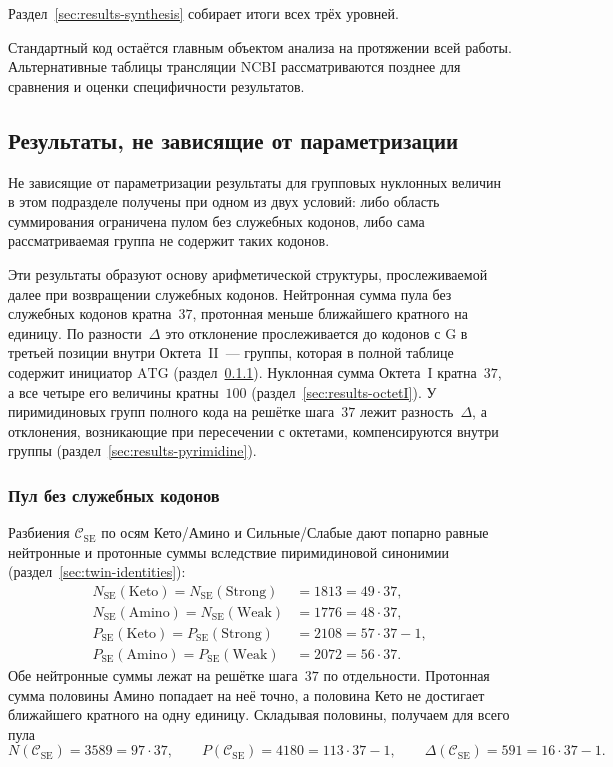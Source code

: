 \documentclass[11pt,a4paper]{article}
\renewcommand{\_}{\origunderscore\allowbreak}
\begin{document}
Раздел~\ref{sec:results-synthesis} собирает итоги всех трёх уровней.

Стандартный код остаётся главным объектом анализа на протяжении всей
работы. Альтернативные таблицы трансляции NCBI рассматриваются позднее
для сравнения и оценки специфичности результатов.

\subsection{Результаты, не зависящие от параметризации}
\label{sec:results-independent}

Не зависящие от параметризации результаты для групповых нуклонных
величин в этом подразделе получены при одном из двух условий: либо
область суммирования ограничена пулом без служебных кодонов, либо сама
рассматриваемая группа не содержит таких кодонов.

Эти результаты образуют основу арифметической структуры,
прослеживаемой далее при возвращении служебных кодонов. Нейтронная сумма пула без служебных кодонов кратна~$37$, протонная
меньше ближайшего кратного на единицу. По разности~$\Delta$ это
отклонение прослеживается до кодонов с $\mathrm{G}$ в третьей позиции
внутри Октета~II~--- группы, которая в полной таблице содержит
инициатор $\mathrm{ATG}$ (раздел~\ref{sec:results-sensepool}).
Нуклонная сумма Октета~I кратна~$37$, а все четыре его величины
кратны~$100$
(раздел~\ref{sec:results-octetI}). У пиримидиновых групп полного кода
на решётке шага~$37$ лежит разность~$\Delta$, а отклонения, возникающие
при пересечении с октетами, компенсируются внутри группы
(раздел~\ref{sec:results-pyrimidine}).

\subsubsection{Пул без служебных кодонов}
\label{sec:results-sensepool}

Разбиения $\mathcal{C}_{\mathrm{SE}}$ по осям Кето/Амино и Сильные/Слабые
дают попарно равные нейтронные и протонные суммы вследствие пиримидиновой
синонимии (раздел~\ref{sec:twin-identities}):
\[
\begin{aligned}
N_{\mathrm{SE}}(\mathrm{Keto}) = N_{\mathrm{SE}}(\mathrm{Strong})
  &= 1813 = 49 \cdot 37, \\
N_{\mathrm{SE}}(\mathrm{Amino}) = N_{\mathrm{SE}}(\mathrm{Weak})
  &= 1776 = 48 \cdot 37, \\
P_{\mathrm{SE}}(\mathrm{Keto}) = P_{\mathrm{SE}}(\mathrm{Strong})
  &= 2108 = 57 \cdot 37 - 1, \\
P_{\mathrm{SE}}(\mathrm{Amino}) = P_{\mathrm{SE}}(\mathrm{Weak})
  &= 2072 = 56 \cdot 37.
\end{aligned}
\]
Обе нейтронные суммы лежат на решётке шага~$37$ по отдельности. Протонная
сумма половины Амино попадает на неё точно, а половина Кето не достигает
ближайшего кратного на одну единицу. Складывая половины, получаем для
всего пула
\[
N(\mathcal{C}_{\mathrm{SE}}) = 3589 = 97 \cdot 37,
\qquad
P(\mathcal{C}_{\mathrm{SE}}) = 4180 = 113 \cdot 37 - 1,
\qquad
\Delta(\mathcal{C}_{\mathrm{SE}}) = 591 = 16 \cdot 37 - 1.
\]
\end{document}
